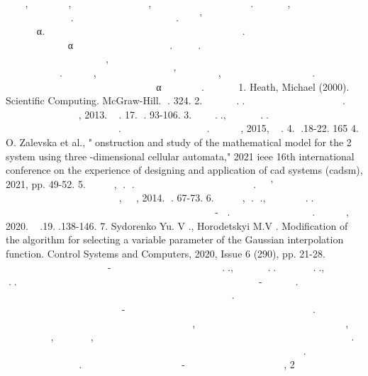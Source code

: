 \documentclass[12pt,a4paper]{article}
\begin{document}
￿￿￿￿￿￿￿, ￿ ￿ ￿￿￿￿￿￿￿￿￿, ￿￿￿ ￿￿￿￿￿￿￿￿￿￿￿￿ ￿￿ ￿￿￿￿￿￿, ￿￿￿￿￿￿￿ ￿￿￿￿￿￿￿￿￿￿￿￿ ￿ ￿￿￿￿￿￿￿￿￿￿￿. ￿￿￿￿￿ ￿￿￿￿￿, ￿ ￿￿￿￿￿￿ ￿￿￿￿￿ ￿￿￿￿￿￿￿ ￿￿￿￿￿￿￿￿ ￿￿￿￿￿￿￿￿ ￿￿￿￿￿. ￿￿￿￿￿￿￿ ￿￿￿￿￿￿￿￿￿ ￿￿￿￿￿ ￿￿ ￿￿￿￿￿￿￿￿. ￿ ￿￿￿￿’￿￿￿￿￿￿￿ ￿￿￿￿￿￿￿ ￿￿￿￿￿￿￿￿￿￿￿ ￿￿￿￿￿￿￿￿￿￿ ￿￿￿￿￿￿￿￿￿ ￿￿￿￿￿￿￿￿￿￿ α. ￿ ￿￿￿￿￿￿￿ ￿￿￿￿￿￿￿￿ ￿￿￿￿ ￿￿￿￿￿￿ ￿ ￿￿￿￿￿￿￿￿￿ ￿￿￿ ￿￿￿￿￿ ￿￿￿￿￿ ￿￿￿￿￿￿￿￿￿. ￿￿￿￿￿ ￿￿￿￿￿ ￿￿￿￿￿￿ ￿￿￿￿￿￿￿￿ ￿￿￿￿￿￿￿￿￿￿￿￿￿ ￿￿￿￿￿￿￿ α ￿ ￿￿￿￿￿￿￿￿￿ ￿￿￿￿￿￿￿￿￿￿￿￿ ￿￿￿￿￿￿￿￿. ￿￿￿￿￿￿￿￿. ￿￿￿￿ ￿￿￿￿￿￿￿￿￿ ￿￿￿￿￿￿ ￿￿￿￿￿￿￿￿￿ ￿￿￿￿￿￿￿￿￿￿￿￿ ￿￿￿￿￿￿ ￿￿￿￿￿￿￿￿ ￿￿ ￿￿￿￿￿￿￿￿ ￿￿￿￿￿￿￿ ￿￿￿￿￿ , ￿￿ ￿￿￿ ￿￿￿￿￿ ￿￿￿￿￿￿￿ ￿￿￿￿￿ ￿￿ ￿￿￿￿￿￿￿￿￿￿￿￿￿ ￿￿￿￿￿￿￿￿￿￿￿￿￿ ￿￿ ￿￿￿￿￿￿￿ ￿￿ ￿￿￿￿￿￿￿￿￿ ￿￿￿￿￿ ￿￿￿￿￿ ￿￿￿￿￿￿￿ ￿￿￿￿￿. ￿￿￿￿￿￿￿￿￿￿, ￿￿￿￿￿￿￿￿ ￿￿ ￿￿￿￿￿￿￿￿￿ ￿￿￿￿’￿￿￿￿￿￿￿ ￿￿￿￿￿￿￿, ￿￿￿￿￿￿￿￿ ￿￿￿￿￿￿￿￿ ￿￿￿￿￿ ￿￿￿￿￿￿￿. ￿￿￿￿￿￿￿ ￿￿￿￿￿ ￿￿￿￿￿￿￿￿ ￿￿ ￿￿￿￿￿￿￿￿￿ ￿￿￿￿￿￿￿ ￿￿￿￿￿￿￿￿￿￿￿￿ ￿￿￿￿￿￿￿￿￿ α ￿￿￿￿￿ ￿￿￿￿￿￿￿. ￿￿￿￿￿￿￿￿￿￿ 1. Heath, Michael (2000). Scientific Computing. McGraw-Hill. ￿. 324. 2. ￿￿￿￿￿￿￿￿￿ ￿.￿. ￿￿￿￿￿￿￿￿ ￿￿￿￿￿￿￿￿ ￿ ￿￿ ￿￿￿￿￿￿￿￿￿ . ￿￿￿￿￿￿￿￿￿￿￿￿￿￿ ￿￿￿￿￿￿￿￿￿￿￿, 2013. ￿￿￿. 17. ￿. 93-106. 3. ￿￿￿￿￿ ￿.￿., ￿￿￿￿￿￿￿￿￿ ￿.￿. ￿￿￿￿ ￿￿￿￿￿￿￿ ￿￿￿￿￿￿￿￿ ￿￿￿￿￿￿￿￿￿￿ ￿￿￿￿￿￿ ￿￿￿￿￿￿￿￿ ￿￿￿￿￿￿￿￿￿￿￿ ￿￿￿￿￿￿￿￿￿￿￿￿. ￿￿￿￿￿￿￿ ￿￿￿￿￿￿￿￿ ￿￿￿￿￿￿￿￿￿￿￿ . ￿￿￿￿￿￿￿￿￿￿, 2015, ￿￿￿. 4. ￿.18-22. 165 4. O. Zalevska et al., "￿onstruction and study of the mathematical model for the 2 system using three -dimensional cellular automata," 2021 ieee 16th international conference on the experience of designing and application of cad systems (cadsm), 2021, pp. 49-52. 5. ￿￿￿￿￿￿￿￿￿, ￿. ￿. ￿￿￿￿￿￿￿￿￿￿￿￿ ￿￿￿￿￿￿￿￿￿￿￿￿￿￿ ￿￿￿￿￿￿￿ ￿￿￿￿￿. ￿￿￿￿’￿￿￿￿￿￿ ￿￿￿￿￿￿￿￿￿￿￿ ￿ ￿￿￿￿￿ ￿ ￿￿￿￿￿￿￿￿￿￿￿ ￿￿ ￿￿￿￿￿￿￿￿ ￿￿￿￿￿￿￿ ￿￿￿￿￿￿￿￿, ￿￿￿￿, 2014. ￿. 67-73. 6. ￿￿￿￿￿￿￿￿￿, ￿. ￿., ￿￿￿￿￿￿￿￿￿￿￿ ￿.￿. ￿￿￿￿￿￿ ￿￿￿￿￿￿ ￿￿￿￿￿￿￿￿￿ ￿￿￿￿￿￿￿￿￿￿￿￿￿￿￿ ￿￿￿￿￿￿￿ ￿￿￿￿￿ ￿￿ ￿￿￿￿￿￿￿￿￿￿￿￿ ￿￿￿￿￿￿￿￿￿￿￿ ￿￿￿￿￿￿- ￿￿. ￿￿￿￿￿￿￿ ￿￿￿￿￿￿￿￿ ￿￿￿￿￿￿￿￿￿￿￿. ￿￿￿￿￿￿￿￿￿￿, 2020. ￿￿￿.19.￿.138-146. 7. Sydorenko Yu. V ., Horodetskyi M.V . Modification of the algorithm for selecting a variable parameter of the Gaussian interpolation function. Control Systems and Computers, 2020, Issue 6 (290), pp. 21-28. ￿￿￿￿￿￿ ￿￿￿￿￿￿￿￿￿ ￿￿￿￿￿￿ ￿￿￿￿￿￿￿￿￿￿ ￿￿￿ ￿￿￿￿- ￿￿￿￿￿￿￿￿￿￿￿￿ ￿￿￿￿￿￿￿ ￿￿￿￿￿ ￿￿￿￿￿￿￿￿￿ ￿.￿., ￿￿￿￿￿￿￿￿￿ ￿.￿. ￿￿￿￿￿￿￿￿￿￿ ￿.￿., ￿￿￿￿￿￿￿￿￿ ￿.￿. ￿ ￿￿￿￿￿￿ ￿￿￿￿￿￿￿￿￿￿￿￿￿￿￿ ￿￿￿￿￿￿￿￿￿￿￿ ￿￿￿￿￿￿￿￿￿￿ ￿￿￿ ￿￿￿￿￿￿￿￿￿￿ ￿ ￿￿￿￿￿￿￿ ￿￿￿￿￿ ￿￿￿￿￿-￿￿￿￿￿￿￿￿￿￿￿￿. ￿￿￿￿￿￿￿￿￿￿ ￿￿￿￿￿￿￿￿￿￿￿ ￿￿￿￿￿￿￿￿￿￿ ￿￿ ￿￿￿￿ ￿￿￿￿￿￿￿￿￿￿￿￿￿￿￿ ￿￿￿￿￿￿￿ ￿￿￿￿￿￿￿￿￿￿￿￿ ￿￿￿￿￿￿￿￿￿￿￿￿. ￿￿￿￿￿￿￿￿￿￿ ￿￿￿￿￿￿￿ ￿￿￿￿￿￿ ￿￿￿￿￿￿￿￿￿￿￿￿ ￿￿￿￿￿￿￿￿￿ ￿￿￿￿￿￿￿￿￿￿￿￿ ￿￿￿￿￿ ￿￿￿￿￿￿ ￿￿￿￿￿- ￿￿￿￿￿￿￿ ￿ ￿￿￿￿￿￿￿￿￿￿￿￿ ￿￿￿￿￿￿￿￿￿￿ ￿ ￿￿￿￿￿￿￿￿￿￿￿￿￿ ￿￿￿￿￿￿ ￿￿￿￿￿￿￿￿. ￿ ￿￿￿￿￿￿￿￿￿ ￿￿￿￿￿ ￿￿￿￿￿￿￿￿ ￿￿￿￿￿￿￿￿￿￿￿￿￿ ￿￿￿￿￿￿￿￿￿￿￿￿ ￿￿￿￿￿ ￿￿￿￿￿￿￿￿ ￿￿￿￿￿￿￿￿￿, ￿￿ ￿￿￿￿￿￿￿￿￿￿￿￿ ￿￿￿￿￿￿￿￿￿￿￿￿ ￿￿￿￿￿￿￿ ￿￿ ￿￿￿￿￿￿￿￿￿￿￿￿, ￿￿￿￿￿￿￿￿￿￿ ￿￿￿￿￿, ￿￿￿￿￿￿￿￿ ￿￿￿, ￿￿￿￿￿￿￿￿￿ ￿￿￿￿￿￿￿￿ ￿ ￿￿￿￿￿￿￿ ￿ ￿￿￿￿￿ ￿￿￿￿￿￿￿￿￿ ￿￿￿￿￿￿ ￿ ￿￿ ￿￿￿￿￿￿￿￿ ￿ ￿￿￿￿￿￿￿ ￿ ￿￿￿￿￿￿￿￿￿. ￿￿￿￿￿￿￿ ￿￿￿￿￿￿￿￿￿￿￿￿ ￿ ￿￿￿￿￿￿￿￿￿￿￿ ￿￿￿￿￿￿￿￿￿￿￿￿￿￿￿￿ ￿ ￿￿￿￿￿ ￿￿￿￿￿￿￿￿￿￿￿ ￿￿￿￿￿￿￿￿ ￿￿￿￿￿ ￿￿￿￿￿￿￿￿￿￿￿￿ ￿￿￿￿￿. ￿￿￿￿￿￿￿ ￿￿￿ ￿￿￿￿￿￿￿ ￿￿￿￿￿￿￿￿￿ ￿￿￿￿￿￿￿￿. ￿ ￿￿￿￿￿￿￿￿￿￿￿ ￿￿￿￿￿￿￿￿￿￿￿￿￿￿￿ ￿￿￿ -￿￿￿￿￿￿ ￿￿￿￿￿￿￿￿ ￿￿￿￿￿￿￿￿ ￿￿￿￿￿￿￿￿￿￿, 2
\end{document}
